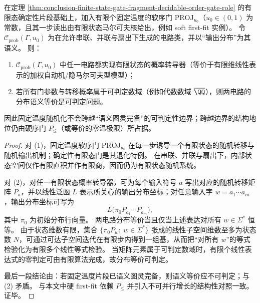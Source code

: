 \begin{theorem}[固定温度软序门加入后的概率有限态性与分布等价可判定性]\label{thm:conclusion-fixed-temp-soft-order-probabilistic-finite-state-decidable}
在定理 \ref{thm:conclusion-finite-state-gate-fragment-decidable-order-gate-role} 的有限态确定性片段基础上，加入有限个固定温度的软序门 \(\mathrm{PROJ}_{u_0}\)（\(u_0\in(0,1)\) 为常数，且其一步读出由有限状态马尔可夫核给出，例如 soft first-fit 实例）。
令 \(\mathcal C_{\mathrm{prob}}(\Gamma,u_0)\) 为在允许串联、并联与扇出下生成的电路类，并以“输出分布”为其语义。
则：
\begin{enumerate}
  \item \(\mathcal C_{\mathrm{prob}}(\Gamma,u_0)\) 中任一电路都实现有限状态的概率转导器（等价于有限维线性表示的加权自动机/隐马尔可夫型模型）；
  \item 若所有门参数与转移概率属于可判定数域（例如代数数域 \(\overline{\QQ}\)），则两电路的分布语义等价是可判定问题。
\end{enumerate}
因此固定温度随机化不会跨越“语义图灵完备”的可判定性边界；跨越边界的结构地位仍由硬序门 \(P_{\le}\)（或等价的零温极限）所占据。
\end{theorem}
\begin{proof}
对 (1)，固定温度软序门 \(\mathrm{PROJ}_{u_0}\) 在每一步诱导一个有限状态的随机转移与随机输出机制；确定性有限态门是其退化特例。
在串联、并联与扇出下，内部状态空间仅作有限直积并作有限商，因而仍为有限状态随机系统。
\par
对 (2)，对任一有限状态概率转导器，可为每个输入符号 \(a\) 写出对应的随机转移矩阵 \(P_a\)，并以线性泛函 \(L\) 表示所关心的输出分布坐标；对任意输入字 \(w=a_1\cdots a_m\)，输出分布坐标可写为
\[
L\bigl(\pi_0 P_{a_1}\cdots P_{a_m}\bigr),
\]
其中 \(\pi_0\) 为初始分布行向量。
两电路分布等价当且仅当上述表达对所有 \(w\in\Sigma^\ast\) 恒等。
由于状态维数有限，集合 \(\{\pi_0P_w:\ w\in\Sigma^\ast\}\) 张成的线性子空间维数至多为状态数 \(N\)，可通过可达子空间迭代在有限步内得到一组基，从而把“对所有 \(w\)”的等式检验化为有限多个线性等式检验。
当矩阵元素属于可判定数域时，有限个线性表达式的零判定可由有限算法完成，故分布等价可判定。
\par
最后一段结论由：若固定温度片段已语义图灵完备，则语义等价应不可判定；与 (2) 矛盾。
与本文中硬 first-fit 依赖 \(P_{\le}\) 并引入不可并行增长的结构性对照一致。证毕。
\end{proof}

